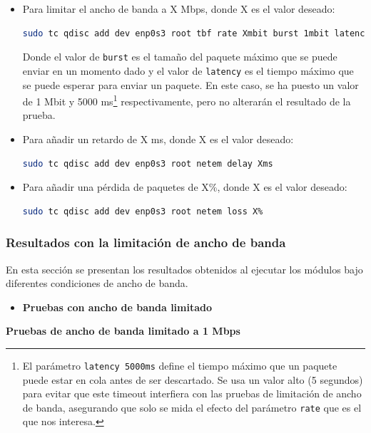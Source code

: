 \begin{itemize}
    \item Para limitar el ancho de banda a X Mbps, donde X es el valor deseado:
    \begin{lstlisting}[language=bash, breaklines=true]
    sudo tc qdisc add dev enp0s3 root tbf rate Xmbit burst 1mbit latency 5000ms
\end{lstlisting}
    Donde el valor de \texttt{burst} es el tamaño del paquete máximo que se puede enviar en un momento dado y el valor de \texttt{latency} es el tiempo máximo que se puede esperar para enviar un paquete. En este caso, se ha puesto un valor de 1 Mbit y 5000 ms\footnote{El parámetro \texttt{latency 5000ms} define el tiempo máximo que un paquete puede estar en cola antes de ser descartado. Se usa un valor alto (5 segundos) para evitar que este timeout interfiera con las pruebas de limitación de ancho de banda, asegurando que solo se mida el efecto del parámetro \texttt{rate} que es el que nos interesa.} respectivamente, pero no alterarán el resultado de la prueba.
    \item Para añadir un retardo de X ms, donde X es el valor deseado:
    \begin{lstlisting}[language=bash]
    sudo tc qdisc add dev enp0s3 root netem delay Xms
\end{lstlisting}
    \item Para añadir una pérdida de paquetes de X\%, donde X es el valor deseado:
    \begin{lstlisting}[language=bash]
    sudo tc qdisc add dev enp0s3 root netem loss X%
\end{lstlisting}
\end{itemize}


\newpage

\subsubsection{Resultados con la limitación de ancho de banda}

En esta sección se presentan los resultados obtenidos al ejecutar los módulos bajo diferentes condiciones de ancho de banda. 
\vspace{\baselineskip}

\begin{itemize}
    \item \textbf{Pruebas con ancho de banda limitado}
\end{itemize}

\textbf{Pruebas de ancho de banda limitado a 1 Mbps}
\vspace{\baselineskip}

